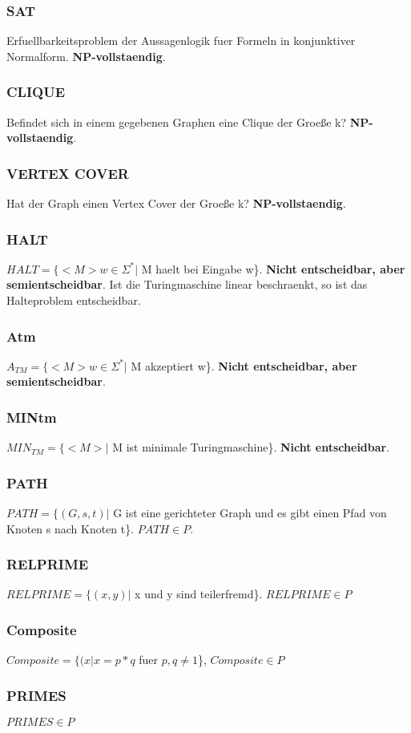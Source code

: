 \documentclass[a4paper]{scrreprt}
\begin{document}
\subsubsection{SAT} Erfuellbarkeitsproblem der Aussagenlogik fuer Formeln in konjunktiver Normalform. \textbf{NP-vollstaendig}.
\subsubsection{CLIQUE} Befindet sich in einem gegebenen Graphen eine Clique der Groeße k? \textbf{NP-vollstaendig}.
\subsubsection{VERTEX COVER} Hat der Graph einen Vertex Cover der Groeße k? \textbf{NP-vollstaendig}.
\subsubsection{HALT} $HALT = \{<M> w \in \Sigma^*|$ M haelt bei Eingabe w\}. \textbf{Nicht entscheidbar, aber semientscheidbar}. Ist die Turingmaschine linear beschraenkt, so ist das Halteproblem entscheidbar.
\subsubsection{Atm} $A_{TM} = \{<M> w \in \Sigma^*|$ M akzeptiert w\}. \textbf{Nicht entscheidbar, aber semientscheidbar}.
\subsubsection{MINtm} $MIN_{TM} = \{<M>|$ M ist minimale Turingmaschine\}. \textbf{Nicht entscheidbar}.
\subsubsection{PATH} $PATH = \{(G, s, t)|$ G ist eine gerichteter Graph und es gibt einen Pfad von Knoten s nach Knoten t\}. \textbf{$PATH \in P$}.
\subsubsection{RELPRIME} $RELPRIME = \{(x, y)|$ x und y sind teilerfremd\}. \textbf{$RELPRIME \in P$}
\subsubsection{Composite} $Composite = \{(x|x = p * q$ fuer $p,q \neq 1$\}, \textbf{$Composite \in P$}
\subsubsection{PRIMES} \textbf{$PRIMES \in P$}
\end{document}
